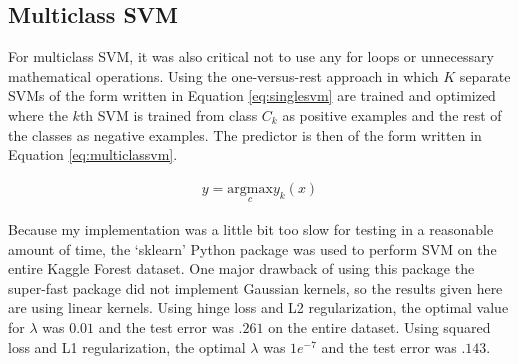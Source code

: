 \documentclass[10pt]{article}
\begin{document}
\subsection{Multiclass SVM}

For multiclass SVM, it was also critical not to use any for loops or unnecessary mathematical operations. Using the one-versus-rest approach in which $K$ separate SVMs of the form written in Equation \ref{eq:singlesvm} are trained and optimized where the $k$th SVM is trained from class $C_k$ as positive examples and the rest of the classes as negative examples. The predictor is then of the form written in Equation \ref{eq:multiclassvm}.

\begin{subequations}
	\begin{align}
		y = \underset{c}{\text{argmax}} y_k(x)
	\end{align}
	\label{eq:multiclassvm}
\end{subequations}

Because my implementation was a little bit too slow for testing in a reasonable amount of time, the `sklearn' Python package was used to perform SVM on the entire Kaggle Forest dataset. One major drawback of using this package the super-fast package did not implement Gaussian kernels, so the results given here are using linear kernels. Using hinge loss and L2 regularization, the optimal value for $\lambda$ was $0.01$ and the test error was $.261$ on the entire dataset. Using squared loss and L1 regularization, the optimal $\lambda$ was $1e^{-7}$ and the test error was $.143$.
\end{document}
